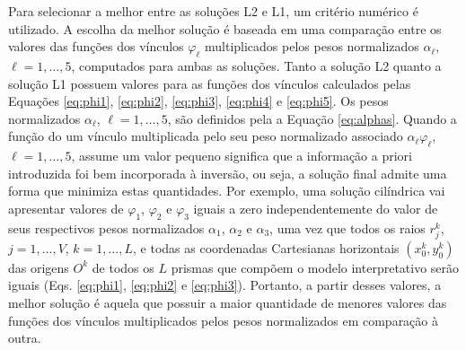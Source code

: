 Para selecionar a melhor entre as soluções L2 e L1, um critério numérico é utilizado.
A escolha da melhor solução é baseada em uma comparação entre os valores das funções dos vínculos $ \varphi_\ell $ multiplicados pelos pesos normalizados $ \alpha_\ell $, $ \ell=1,\dots,5 $, computados para ambas as soluções.
Tanto a solução L2 quanto a solução L1 possuem valores para as funções dos vínculos calculados pelas Equações \ref{eq:phi1}, \ref{eq:phi2}, \ref{eq:phi3}, \ref{eq:phi4} e \ref{eq:phi5}.
Os pesos normalizados $ \alpha_\ell $, $ \ell=1,\dots,5 $, são definidos pela a Equação \ref{eq:alphas}. 
Quando a função do um vínculo multiplicada pelo seu peso normalizado associado $ \alpha_\ell \varphi_\ell  $, $ \ell=1,\dots,5 $, assume um valor pequeno significa que a informação a priori introduzida foi bem incorporada à inversão, ou seja, a solução final admite uma forma que minimiza estas quantidades.
Por exemplo, uma solução cilíndrica vai apresentar valores de $ \varphi_1 $, $ \varphi_2 $ e $ \varphi_3 $ iguais a zero independentemente do valor de seus respectivos pesos normalizados $ \alpha_1 $, $ \alpha_2 $ e $ \alpha_3 $, uma vez que todos os raios $ r^k_j $, $ j=1, \dots, V $, $ k=1,\dots,L $, e todas as coordenadas Cartesianas horizontais $ (x^k_0, y^k_0) $ das origens $ O^k $ de todos os $ L $ prismas que compõem o modelo interpretativo serão iguais (Eqs. \ref{eq:phi1}, \ref{eq:phi2} e \ref{eq:phi3}).
Portanto, a partir desses valores, a melhor solução é aquela que possuir a maior quantidade de menores valores das funções dos vínculos multiplicados pelos pesos normalizados em comparação à outra.